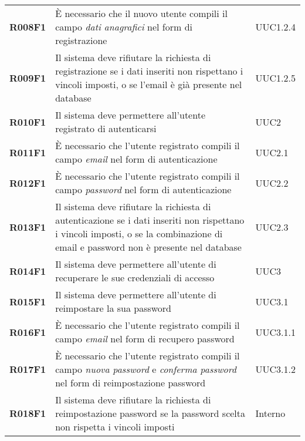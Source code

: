 \documentclass[../analisi-dei-requisiti.tex]{subfiles}
\begin{document}
\begin{longtable}[H]{>{\centering\bfseries}m{3cm} >{\centering}m{10cm} >{\centering\arraybackslash}m{3cm}}
  R008F1                  & È necessario che il nuovo utente compili il campo \textit{dati anagrafici} nel form di registrazione                                                                               & UUC1.2.4                      \\
  R009F1                  & Il sistema deve rifiutare la richiesta di registrazione se i dati inseriti non rispettano i vincoli imposti, o se l'email è già presente nel database                              & UUC1.2.5                      \\
  R010F1                  & Il sistema deve permettere all'utente registrato di autenticarsi                                                                                                                   & UUC2                          \\
  R011F1                  & È necessario che l'utente registrato compili il campo \textit{email} nel form di autenticazione                                                                                    & UUC2.1                        \\
  R012F1                  & È necessario che l'utente registrato compili il campo \textit{password} nel form di autenticazione                                                                                 & UUC2.2                        \\
  R013F1                  & Il sistema deve rifiutare la richiesta di autenticazione se i dati inseriti non rispettano i vincoli imposti, o se la combinazione di email e password non è presente nel database & UUC2.3                        \\
  R014F1                  & Il sistema deve permettere all'utente di recuperare le sue credenziali di accesso                                                                                                  & UUC3                          \\
  R015F1                  & Il sistema deve permettere all'utente di reimpostare la sua password                                                                                                               & UUC3.1                        \\
  R016F1                  & È necessario che l'utente registrato compili il campo \textit{email} nel form di recupero password                                                                                 & UUC3.1.1                      \\
  R017F1                  & È necessario che l'utente registrato compili il campo \textit{nuova password} e \textit{conferma password} nel form di reimpostazione password                                     & UUC3.1.2                      \\
  R018F1                  & Il sistema deve rifiutare la richiesta di reimpostazione password se la password scelta non rispetta i vincoli imposti                                                             & Interno                       \\


\end{longtable}
\end{document}
